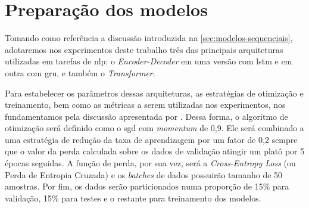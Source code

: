 \section{Preparação dos modelos}
\label{sec:metodos-preparacao-modelos}






Tomando como referência a discussão introduzida na \autoref{sec:modelos-sequenciais}, adotaremos nos experimentos deste trabalho três das principais arquiteturas utilizadas em tarefas de \acrfull{nlp}: o \textit{Encoder-Decoder} em uma versão com \acrfull{lstm} e em outra com \acrfull{gru}, e também o \textit{Transformer}.


Para estabelecer os parâmetros dessas arquiteturas, as estratégias de otimização e treinamento, bem como as métricas a serem utilizadas nos experimentos, nos fundamentamos pela discussão apresentada por .
Dessa forma, o algoritmo de otimização será definido como o \acrfull{sgd} com \textit{momentum} de 0,9. Ele será combinado a uma estratégia de redução da taxa de aprendizagem por um fator de 0,2 sempre que o valor da perda calculada sobre os dados de validação atingir um platô por 5 épocas seguidas. A função de perda, por sua vez, será a \textit{Cross-Entropy Loss} (ou Perda de Entropia Cruzada) e os \textit{batches} de dados possuirão tamanho de 50 amostras. Por fim, os dados serão particionados numa proporção de 15\% para validação, 15\% para testes e o restante para treinamento dos modelos.

